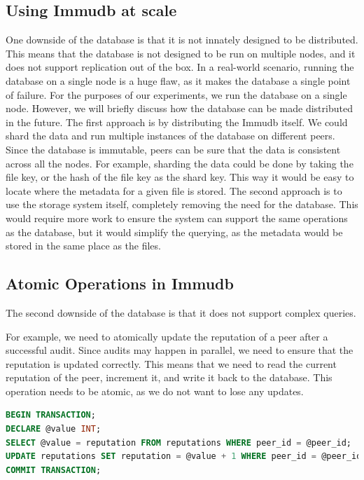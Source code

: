 \subsection{Using Immudb at scale}

One downside of the database is that it is not innately designed to be distributed.
This means that the database is not designed to be run on multiple nodes,
and it does not support replication out of the box.
In a real-world scenario, running the database on a single node is a huge flaw,
as it makes the database a single point of failure.
For the purposes of our experiments, we run the database on a single node.
However, we will briefly discuss how the database can be made distributed in the future.
The first approach is by distributing the Immudb itself.
We could shard the data and run multiple instances of the database on different peers.
Since the database is immutable, peers can be sure that the data is consistent across all the nodes.
For example, sharding the data could be done by taking the file key, or the hash of the file key as the shard key.
This way it would be easy to locate where the metadata for a given file is stored.
The second approach is to use the storage system itself, completely removing the need for the database.
This would require more work to ensure the system can support the same operations as the database,
but it would simplify the querying, as the metadata would be stored in the same place as the files.

\subsection{Atomic Operations in Immudb}
\label{section:atomic-operations}

The second downside of the database is that it does not support complex queries.

For example, we need to atomically update the reputation of a peer after a successful audit.
Since audits may happen in parallel, we need to ensure that the reputation is updated correctly.
This means that we need to read the current reputation of the peer, increment it, and write it back to the database.
This operation needs to be atomic, as we do not want to lose any updates.

\begin{lstlisting}[language=SQL, caption={SQL query to update the reputation of a peer}, label={lst:sql-query}]
BEGIN TRANSACTION;
DECLARE @value INT;
SELECT @value = reputation FROM reputations WHERE peer_id = @peer_id;
UPDATE reputations SET reputation = @value + 1 WHERE peer_id = @peer_id;
COMMIT TRANSACTION;
\end{lstlisting}

